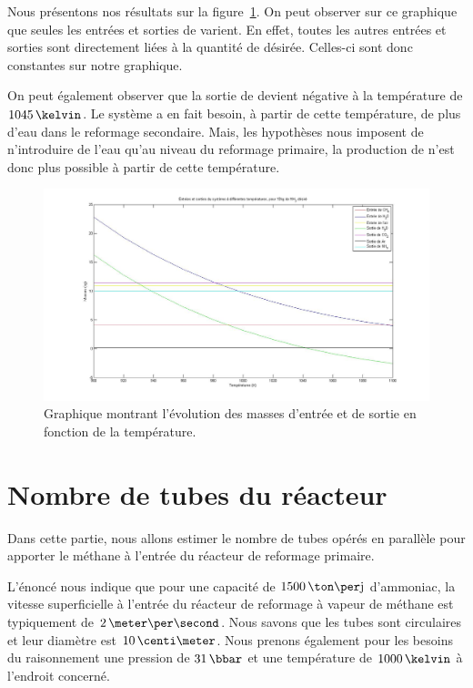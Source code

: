 Nous présentons nos résultats sur la figure~\ref{fig:graphe}. On peut observer sur ce graphique que seules les entrées et sorties de
 varient.
En effet, toutes les autres entrées et sorties sont directement
liées à la quantité de  désirée.
Celles-ci sont donc constantes sur notre graphique.

On peut également observer que la sortie de  devient négative
à la température de $1045\,\kelvin$.
Le système a en fait besoin, à partir de cette température,
de plus d'eau dans le reformage secondaire. Mais, les hypothèses nous imposent de n'introduire de l'eau qu'au niveau du reformage primaire, la production de  n'est donc plus possible à partir de cette température.

\begin{figure}
\begin{center}
\includegraphics[width=\textwidth]{img/graphe1}
\caption{Graphique montrant l'évolution des masses d'entrée et de sortie en fonction de la température.}
\label{fig:graphe}
\end{center}
\end{figure}

\section{Nombre de tubes du réacteur}

Dans cette partie, nous allons estimer le nombre de tubes opérés
en parallèle pour apporter le méthane à l'entrée du réacteur de reformage primaire.

L’énoncé nous indique que pour une capacité de $1500\,\ton\per\jour$ d’ammoniac,
la vitesse superficielle à l’entrée du réacteur de reformage
à vapeur de méthane est typiquement de $2\,\meter\per\second$.
Nous savons que les tubes sont circulaires et leur diamètre est $10\,\centi\meter$.
Nous prenons également pour les besoins du raisonnement
une pression de $31\,\bbar$ et une température de $1000\,\kelvin$
à l'endroit concerné.

